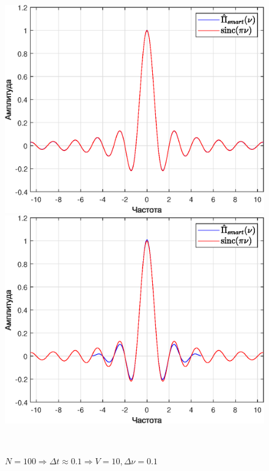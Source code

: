 \documentclass[a4paper]{article}
\begin{document}
\begin{figure}[H]
    \begin{minipage}{0.5\textwidth}
        \centering \includegraphics[width=\textwidth]{graphs/3/T_10_dt_0.01001_V_100_dv_0.1/fourier_smart.eps}
        \caption{$N = 1000 \Rightarrow \Delta t \approx 0.01 \Rightarrow V = 100, \Delta \nu = 0.1$}
    \end{minipage}\hfill
    \begin{minipage}{0.5\textwidth}
        \centering \includegraphics[width=\textwidth]{graphs/3/T_10_dt_0.10101_V_10_dv_0.1/fourier_smart.eps}
        \caption{$N = 100 \Rightarrow \Delta t \approx 0.1 \Rightarrow V = 10, \Delta \nu = 0.1$}
    \end{minipage}\\[1em]
\end{figure}\noindent\
\end{document}
